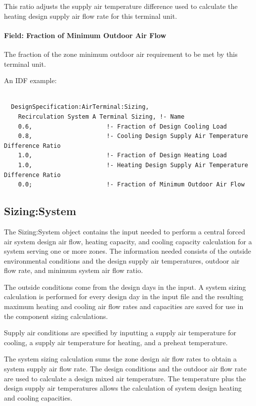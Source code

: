 This ratio adjusts the supply air temperature difference used to calculate the heating design supply air flow rate for this terminal unit.

\paragraph{Field: Fraction of Minimum Outdoor Air Flow}\label{fraction-of-minimum-outdoor-air-requirement}

The fraction of the zone minimum outdoor air requirement to be met by this terminal unit.

An IDF example:

\begin{lstlisting}

  DesignSpecification:AirTerminal:Sizing,
    Recirculation System A Terminal Sizing, !- Name
    0.6,                     !- Fraction of Design Cooling Load
    0.8,                     !- Cooling Design Supply Air Temperature Difference Ratio
    1.0,                     !- Fraction of Design Heating Load
    1.0,                     !- Heating Design Supply Air Temperature Difference Ratio
    0.0;                     !- Fraction of Minimum Outdoor Air Flow
\end{lstlisting}

\subsection{Sizing:System}\label{sizingsystem}

The Sizing:System object contains the input needed to perform a central forced air system design air flow, heating capacity, and cooling capacity calculation for a system serving one or more zones. The information needed consists of the outside environmental conditions and the design supply air temperatures, outdoor air flow rate, and minimum system air flow ratio.

The outside conditions come from the design days in the input. A system sizing calculation is performed for every design day in the input file and the resulting maximum heating and cooling air flow rates and capacities are saved for use in the component sizing calculations.

Supply air conditions are specified by inputting a supply air temperature for cooling, a supply air temperature for heating, and a preheat temperature.

The system sizing calculation sums the zone design air flow rates to obtain a system supply air flow rate. The design conditions and the outdoor air flow rate are used to calculate a design mixed air temperature. The temperature plus the design supply air temperatures allows the calculation of system design heating and cooling capacities.

